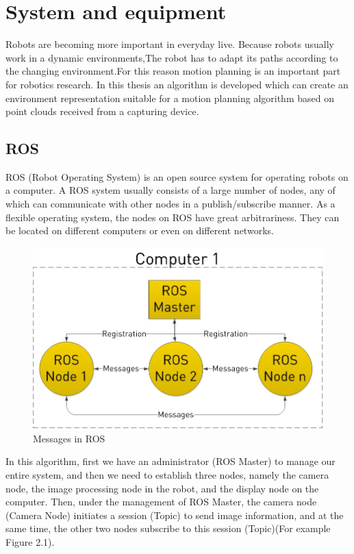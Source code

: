 \chapter{System and equipment}
Robots are becoming more important in everyday live. Because robots usually work in  a dynamic environments,The robot has to adapt its paths according to the changing environment.For this reason motion planning is an important part for robotics research. In this thesis an algorithm is developed which can create an environment representation suitable for a motion planning algorithm based on point clouds received from a capturing device.
\section{ROS}
ROS (Robot Operating System) is an open source system for operating robots on a computer. A ROS system usually consists of a large number of nodes, any of which can communicate with other nodes in a publish/subscribe manner. As a flexible operating system, the nodes on ROS have great arbitrariness. They can be located on different computers or even on different networks.\\
\begin{figure}[htp]
	\centering %
	\includegraphics[width = 15.3cm]{figures/Messages}
	\caption{ Messages in ROS}
	\label{fig:figure1label}
\end{figure}
In this algorithm, first we have an administrator (ROS Master) to manage our entire system, and then we need to establish three nodes, namely the camera node, the image processing node in the robot, and the display node on the computer. Then, under the management of ROS Master, the camera node (Camera Node) initiates a session (Topic) to send image information, and at the same time, the other two nodes subscribe to this session (Topic)(For example Figure 2.1). \\
